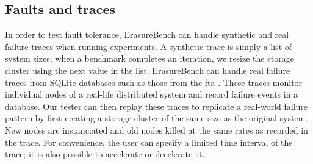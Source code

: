 \subsection{Faults and traces}

In order to test fault tolerance, ErasureBench can handle synthetic and real failure traces when running experiments. A synthetic trace is simply a list of system sizes; when a benchmark completes an iteration, we resize the storage cluster using the next value in the list. ErasureBench can handle real failure traces from SQLite databases such as those from the \ac{fta} \autocite{fta-journal,fta-paper}. These traces monitor individual nodes of a real-life distributed system and record failure events in a database. Our tester can then replay these traces to replicate a real-world failure pattern by first creating a storage cluster of the same size as the original system. New nodes are instanciated and old nodes killed at the same rates as recorded in the trace. For convenience, the user can specify a limited time interval of the trace; it is also possible to accelerate or decelerate~it.
